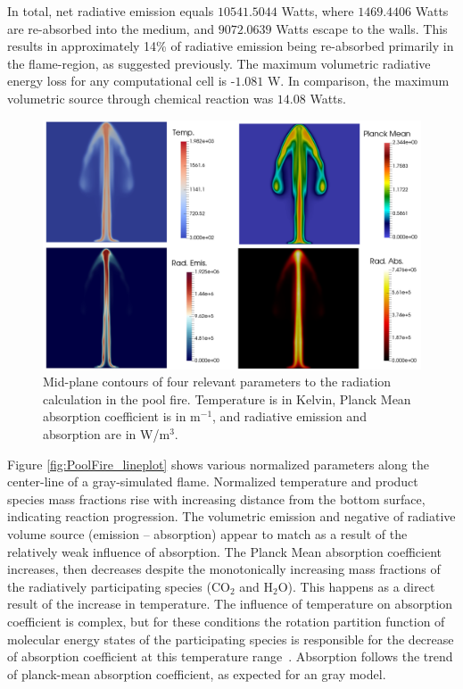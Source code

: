In total, net radiative emission equals $10541.5044$ Watts, where $1469.4406$ Watts are re-absorbed into the medium, and $9072.0639$ Watts escape to the walls. This results in approximately 14\% of radiative emission being re-absorbed primarily in the flame-region, as suggested previously. 
The maximum volumetric radiative energy loss for any computational cell is -$1.081$ W. In comparison, the maximum volumetric source through chemical reaction was $14.08$ Watts.

\begin{figure}
\centering
\includegraphics[width=0.9\linewidth]{figures/ch4/PoolFire_quadcomparison.png}
\caption{Mid-plane contours of four relevant parameters to the radiation calculation in the pool fire. Temperature is in Kelvin, Planck Mean absorption coefficient is in m$^{-1}$, and radiative emission and absorption are in W/m$^3$.}
\label{fig:PoolFire_quadcomparison}
\end{figure}

Figure \ref{fig:PoolFire_lineplot} shows various normalized parameters along the center-line of a gray-simulated flame. 
Normalized temperature and product species mass fractions rise with increasing distance from the bottom surface, indicating reaction progression. 
The volumetric emission and negative of radiative volume source (emission – absorption) appear to match as a result of the relatively weak influence of absorption.
The Planck Mean absorption coefficient increases, then decreases despite the monotonically increasing mass fractions of the radiatively participating species (CO$_2$ and H$_2$O). This happens as a direct result of the increase in temperature. 
The influence of temperature on absorption coefficient is complex, but for these conditions the rotation partition function of molecular energy states of the participating species is responsible for the decrease of absorption coefficient at this temperature range~\cite{Modest2013RadiativeTransfer}.
Absorption follows the trend of planck-mean absorption coefficient, as expected for an gray model.

